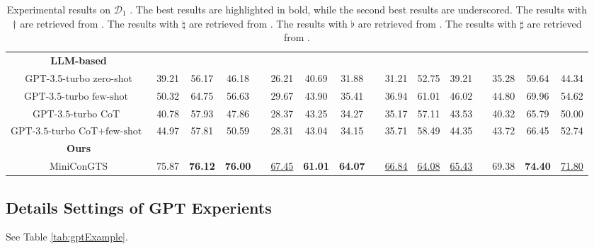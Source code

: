 \documentclass[11pt]{article}
\begin{document}
\begin{table}[ht]
{\begin{tabular}{cccccccccccccccc}
    \textbf{LLM-based} &       &       &       &       &       &       &       &       &       &       &       &       &       &       &  \\
    GPT-3.5-turbo zero-shot  & 39.21     & 56.17     & 46.18 &       & 26.21     & 40.69     & 31.88 &       & 31.21     & 52.75     & 39.21 &       & 35.28     & 59.64    & 44.34 \\
    $\textrm{GPT-3.5-turbo few-shot}$\  & 50.32     & 64.75     & 56.63 &       & 29.67     & 43.90     & 35.41 &       & 36.94     & 61.01     & 46.02 &       & 44.80     & 69.96     & 54.62 \\
    $\textrm{GPT-3.5-turbo CoT}$\  & 40.78     & 57.93     & 47.86 &       & 28.37     & 43.25     & 34.27 &       & 35.17     & 57.11     & 43.53 &       & 40.32     & 65.79     & 50.00 \\
    $\textrm{GPT-3.5-turbo CoT+few-shot}$\  & 44.97     & 57.81     & 50.59 &       & 28.31     & 43.04     & 34.15 &       & 35.71     & 58.49     & 44.35 &       & 43.72     & 66.45     & 52.74 \\
    \midrule
    
    \textbf{Ours} &       &       &       &       &       &       &       &       &       &       &       &       &       &       &  \\
      MiniConGTS    & 75.87 & \textbf{76.12} & \textbf{76.00} &       & \underline{67.45} & \textbf{61.01} & \textbf{64.07} &       & \underline{66.84} & \underline{64.08} & \underline{65.43} &       & 69.38 & \textbf{74.40} & \underline{71.80} \\
    \bottomrule
    \hline
    \end{tabular}
}
    \caption{Experimental results on $\mathcal{D}_1$ \cite{wu2020grid}. The best results are highlighted in bold,  while the second best results are underscored. The results with $\dagger$ are retrieved from \cite{yu2021aspect}. The results with $\natural$ are retrieved from \cite{xu2020position}. 
The results with $\flat$ are retrieved from \cite{wu2020grid}. 
The results with $\sharp$ are retrieved from \cite{peng2020knowing}.
}
\label{tab:D1performance}
\end{table}




\subsection{Details Settings of GPT Experients}
\label{sec:Details of GPT Experients}
See Table \ref{tab:gptExample}. 
\end{document}
